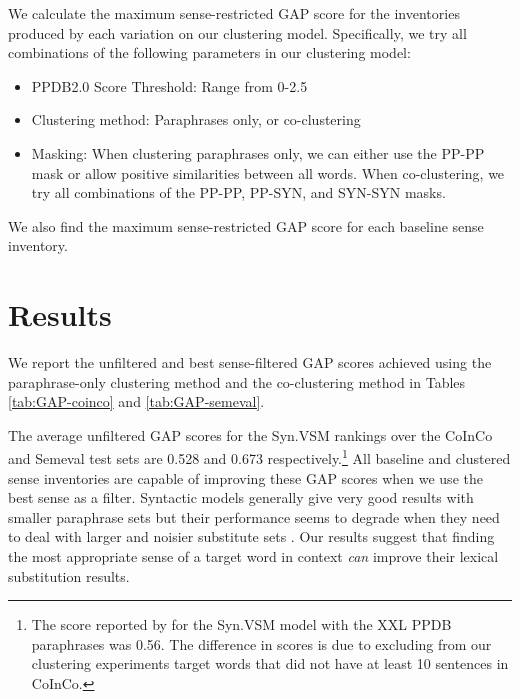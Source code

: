 \documentclass[11pt]{article}
\begin{document}


We calculate the maximum sense-restricted GAP score for the inventories produced by each variation on our clustering model. Specifically, we try all combinations of the following parameters in our clustering model:

\begin{itemize}
	\item PPDB2.0 Score Threshold: Range from 0-2.5
	\item Clustering method: Paraphrases only, or co-clustering
	\item Masking: When clustering paraphrases only, we can either use the PP-PP mask or allow positive similarities between all words. When co-clustering, we try all combinations of the PP-PP, PP-SYN, and SYN-SYN masks.
\end{itemize}

\noindent We also find the maximum sense-restricted GAP score for each baseline sense inventory.


\section{Results}

We report the unfiltered and best sense-filtered GAP scores achieved using the paraphrase-only clustering method %
and the co-clustering method in Tables \ref{tab:GAP-coinco} and \ref{tab:GAP-semeval}. 

The average unfiltered GAP scores for the Syn.VSM rankings over the CoInCo and Semeval test sets are 0.528 and 0.673 respectively.\footnote{The score reported by  for the Syn.VSM model with the XXL PPDB paraphrases was 0.56. The difference in scores is due to excluding from our clustering experiments target words that did not have at least 10 sentences in CoInCo.}  All baseline and clustered sense inventories are capable of improving these GAP scores when we use the best sense as a filter. Syntactic models generally give very good results with smaller paraphrase sets \cite{kremer-EtAl:2014:EACL} but their performance seems to degrade when they need to deal with larger and noisier substitute sets \cite{apidianaki:2016:EMNLP2016}. Our results suggest that finding the most appropriate sense of a target word in context \textit{can} improve their lexical substitution results. 
\end{document}
